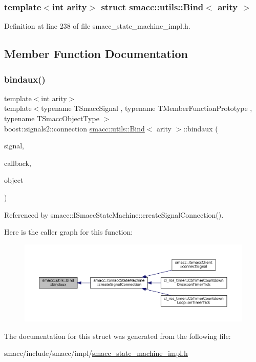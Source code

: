 \subsubsection*{template$<$int arity$>$\newline
struct smacc\+::utils\+::\+Bind$<$ arity $>$}



Definition at line 238 of file smacc\+\_\+state\+\_\+machine\+\_\+impl.\+h.



\subsection{Member Function Documentation}
\mbox{\label{structsmacc_1_1utils_1_1Bind_aa0f4ba76fbd5fdb865df51b61d4269f3}} 
\subsubsection{\texorpdfstring{bindaux()}{bindaux()}}
{\footnotesize\ttfamily template$<$int arity$>$ \\
template$<$typename T\+Smacc\+Signal , typename T\+Member\+Function\+Prototype , typename T\+Smacc\+Object\+Type $>$ \\
boost\+::signals2\+::connection \hyperlink{structsmacc_1_1utils_1_1Bind}{smacc\+::utils\+::\+Bind}$<$ arity $>$\+::bindaux (\begin{DoxyParamCaption}\item[{T\+Smacc\+Signal \&}]{signal,  }\item[{T\+Member\+Function\+Prototype}]{callback,  }\item[{T\+Smacc\+Object\+Type $\ast$}]{object }\end{DoxyParamCaption})}



Referenced by smacc\+::\+I\+Smacc\+State\+Machine\+::create\+Signal\+Connection().

Here is the caller graph for this function\+:
\nopagebreak
\begin{figure}[H]
\begin{center}
\leavevmode
\includegraphics[width=350pt]{structsmacc_1_1utils_1_1Bind_aa0f4ba76fbd5fdb865df51b61d4269f3_icgraph}
\end{center}
\end{figure}


The documentation for this struct was generated from the following file\+:\begin{DoxyCompactItemize}
\item 
smacc/include/smacc/impl/\hyperlink{smacc__state__machine__impl_8h}{smacc\+\_\+state\+\_\+machine\+\_\+impl.\+h}\end{DoxyCompactItemize}
